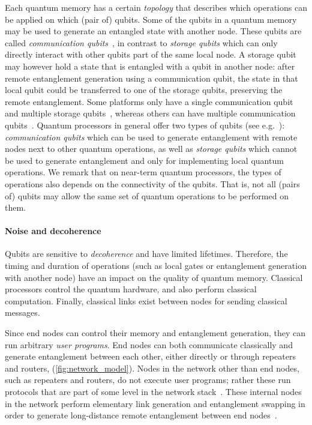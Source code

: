 Each quantum memory has a certain \textit{topology} that describes which operations can be applied on which (pair of) qubits.
Some of the qubits in a quantum memory may be used to generate an entangled state with another node.
These qubits are called \emph{communication qubits}~\cite{dahlberg2019linklayer}, in contrast to \emph{storage qubits} which can only directly interact with other qubits part of the same local node.
A storage qubit may however hold a state that is entangled with a qubit in another node: after remote entanglement generation using a communication qubit, the state in that local qubit could be transferred to one of the storage qubits, preserving the remote entanglement.
Some platforms only have a single communication qubit and multiple storage qubits~\cite{Bernien2014}, whereas others can have multiple communication qubits~\cite{Inlek2017}.
Quantum processors in general offer two types of qubits (see e.g.~\cite{dahlberg_2019_egp}): \emph{communication qubits} which can be used to generate entanglement with remote nodes next to other quantum operations, as well as \emph{storage qubits} which cannot be used to generate entanglement and only for implementing local quantum operations.
We remark that on near-term quantum processors, the types of operations also depends on the connectivity of the qubits.
That is, not all (pairs of) qubits may allow the same set of quantum operations to be performed on them.

\paragraph{Noise and decoherence}
Qubits are sensitive to \emph{decoherence} and have limited lifetimes.
Therefore, the timing and duration of operations (such as local gates or entanglement generation with another node) have an impact on the quality of quantum memory. Classical processors control the quantum hardware, and also perform classical computation.
Finally, classical links exist between nodes for sending classical messages.

Since end nodes can control their memory and entanglement generation, they can run arbitrary \textit{user programs}.
End nodes can both communicate classically and generate entanglement between each other, either directly or through repeaters and routers, (\cref{fig:network_model}). Nodes in the network other than end nodes, such as repeaters and routers, do not execute user programs; rather these run protocols that are part of some level in the
network stack~\cite{dahlberg2019linklayer,kozlowski2020networklayer}.
These internal nodes in the network perform elementary link generation and entanglement swapping in order to generate long-distance remote entanglement between end nodes~\cite{dahlberg2019linklayer}.

